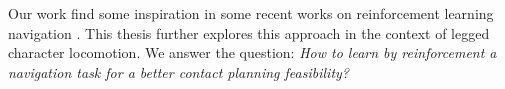 Our work find some inspiration in some recent works on reinforcement learning navigation \cite{prm_rl_2019, jaedong_2018_crowd_rl}. 
This thesis further explores this approach in the context of legged character locomotion.
We answer the question: \textit{How to learn by reinforcement a navigation task for a better contact planning feasibility?}


